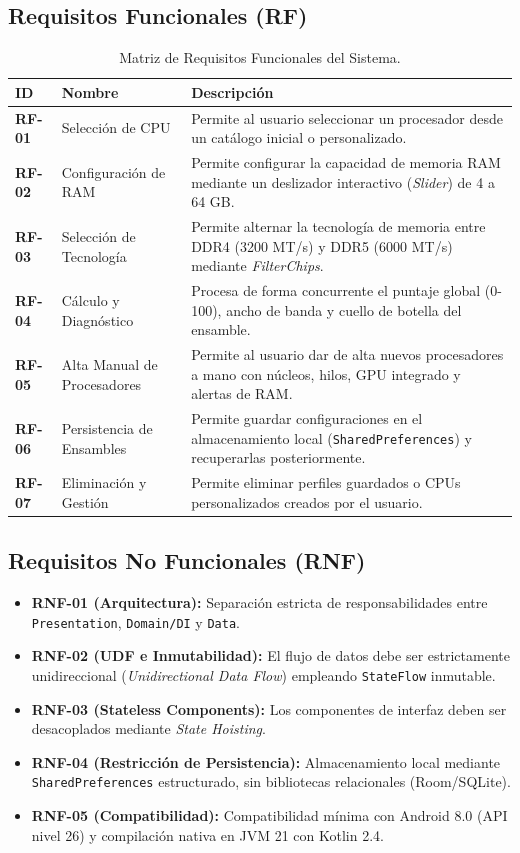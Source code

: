 \documentclass[12pt,a4paper]{article}
\begin{document}
\subsection{Requisitos Funcionales (RF)}
\begin{table}[H]
\centering
\small
\begin{tabular}{@{}llp{10cm}@{}}
\toprule
\textbf{ID} & \textbf{Nombre} & \textbf{Descripción} \\ \midrule
\textbf{RF-01} & Selección de CPU & Permite al usuario seleccionar un procesador desde un catálogo inicial o personalizado. \\
\textbf{RF-02} & Configuración de RAM & Permite configurar la capacidad de memoria RAM mediante un deslizador interactivo (\textit{Slider}) de 4 a 64 GB. \\
\textbf{RF-03} & Selección de Tecnología & Permite alternar la tecnología de memoria entre DDR4 (3200 MT/s) y DDR5 (6000 MT/s) mediante \textit{FilterChips}. \\
\textbf{RF-04} & Cálculo y Diagnóstico & Procesa de forma concurrente el puntaje global (0-100), ancho de banda y cuello de botella del ensamble. \\
\textbf{RF-05} & Alta Manual de Procesadores & Permite al usuario dar de alta nuevos procesadores a mano con núcleos, hilos, GPU integrado y alertas de RAM. \\
\textbf{RF-06} & Persistencia de Ensambles & Permite guardar configuraciones en el almacenamiento local (\texttt{SharedPreferences}) y recuperarlas posteriormente. \\
\textbf{RF-07} & Eliminación y Gestión & Permite eliminar perfiles guardados o CPUs personalizados creados por el usuario. \\ \bottomrule
\end{tabular}
\caption{Matriz de Requisitos Funcionales del Sistema.}
\end{table}

\subsection{Requisitos No Funcionales (RNF)}
\begin{itemize}
    \item \textbf{RNF-01 (Arquitectura):} Separación estricta de responsabilidades entre \texttt{Presentation}, \texttt{Domain/DI} y \texttt{Data}.
    \item \textbf{RNF-02 (UDF e Inmutabilidad):} El flujo de datos debe ser estrictamente unidireccional (\textit{Unidirectional Data Flow}) empleando \texttt{StateFlow} inmutable.
    \item \textbf{RNF-03 (Stateless Components):} Los componentes de interfaz deben ser desacoplados mediante \textit{State Hoisting}.
    \item \textbf{RNF-04 (Restricción de Persistencia):} Almacenamiento local mediante \texttt{SharedPreferences} estructurado, sin bibliotecas relacionales (Room/SQLite).
    \item \textbf{RNF-05 (Compatibilidad):} Compatibilidad mínima con Android 8.0 (API nivel 26) y compilación nativa en JVM 21 con Kotlin 2.4.
\end{itemize}
\end{document}
